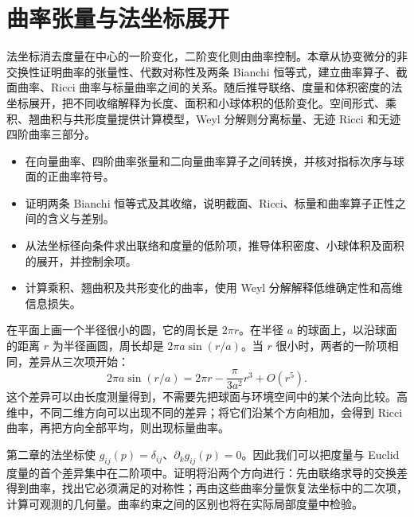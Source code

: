 
% 
% 

\chapter{曲率张量与法坐标展开}
\label{g3:ch:03}

\begin{chapterabstract}
	法坐标消去度量在中心的一阶变化，二阶变化则由曲率控制。本章从协变微分的非交换性证明曲率的张量性、代数对称性及两条 Bianchi 恒等式，建立曲率算子、截面曲率、Ricci 曲率与标量曲率之间的关系。随后推导联络、度量和体积密度的法坐标展开，把不同收缩解释为长度、面积和小球体积的低阶变化。空间形式、乘积、翘曲积与共形度量提供计算模型，Weyl 分解则分离标量、无迹 Ricci 和无迹四阶曲率三部分。
\end{chapterabstract}

\begin{learninggoals}
	\begin{itemize}
		\item 在向量曲率、四阶曲率张量和二向量曲率算子之间转换，并核对指标次序与球面的正曲率符号。
		\item 证明两条 Bianchi 恒等式及其收缩，说明截面、Ricci、标量和曲率算子正性之间的含义与差别。
		\item 从法坐标径向条件求出联络和度量的低阶项，推导体积密度、小球体积及面积的展开，并控制余项。
		\item 计算乘积、翘曲积及共形变化的曲率，使用 Weyl 分解解释低维确定性和高维信息损失。
	\end{itemize}
\end{learninggoals}

在平面上画一个半径很小的圆，它的周长是 \(2\pi r\)。在半径 \(a\) 的球面上，以沿球面的距离 \(r\) 为半径画圆，周长却是 \(2\pi a\sin(r/a)\)。当 \(r\) 很小时，两者的一阶项相同，差异从三次项开始：
\[
	2\pi a\sin(r/a)=2\pi r-\frac{\pi}{3a^2}r^3+O(r^5).
\]
这个差异可以由长度测量得到，不需要先把球面与环境空间中的某个法向比较。高维中，不同二维方向可以出现不同的差异；将它们沿某个方向相加，会得到 Ricci 曲率，再把方向全部平均，则出现标量曲率。

\ProseParagraphBreak

第二章的法坐标使 \(g_{ij}(p)=\delta_{ij}\)、\(\partial_kg_{ij}(p)=0\)。因此我们可以把度量与 Euclid 度量的首个差异集中在二阶项中。证明将沿两个方向进行：先由联络求导的交换差得到曲率，找出它必须满足的对称性；再由这些曲率分量恢复法坐标中的二次项，计算可观测的几何量。曲率约束之间的区别也将在实际局部度量中检验。

